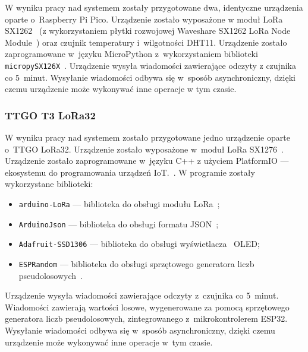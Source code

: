 W wyniku pracy nad systemem zostały przygotowane dwa, identyczne urządzenia oparte o~Raspberry Pi Pico.
Urządzenie zostało wyposażone w moduł LoRa SX1262~\cite{PICO:sx1262-doc} (z wykorzystaniem płytki rozwojowej Waveshare SX1262 LoRa Node Module~\cite{PICO:waveshare-doc}) oraz czujnik temperatury i~wilgotności DHT11.
Urządzenie zostało zaprogramowane w~języku MicroPython z~wykorzystaniem biblioteki \texttt{micropySX126X}~\cite{PICO:lora-lib}.
Urządzenie wysyła wiadomości zawierające odczyty z czujnika co 5~minut.
Wysyłanie wiadomości odbywa się w~sposób asynchroniczny, dzięki czemu urządzenie może wykonywać inne operacje w tym czasie.

\subsubsection{TTGO T3 LoRa32}
W wyniku pracy nad systemem zostało przygotowane jedno urządzenie oparte o~TTGO LoRa32.
Urządzenie zostało wyposażone w~moduł LoRa SX1276~\cite{ESP32:sx1276-doc}.
Urządzenie zostało zaprogramowane w~języku C++ z użyciem PlatformIO — ekosystemu do programowania urządzeń IoT.~\cite{tool:pio}.
W programie zostały wykorzystane biblioteki:
\begin{itemize}
    \item \texttt{arduino-LoRa} — biblioteka do obsługi modułu LoRa~\cite{ESP32:lora-lib};
    \item \texttt{ArduinoJson} — biblioteka do obsługi formatu JSON~\cite{ESP32:ArduinoJson};
    \item \texttt{Adafruit-SSD1306} — biblioteka do obsługi wyświetlacza~\cite{ESP32:Adafruit-SSD1306} OLED;
    \item \texttt{ESPRandom} — biblioteka do obsługi sprzętowego generatora liczb pseudolosowych~\cite{ESP32:ESPRandom}.
\end{itemize}
Urządzenie wysyła wiadomości zawierające odczyty z~czujnika co 5~minut.
Wiadomości zawierają wartości losowe, wygenerowane za pomocą sprzętowego generatora liczb pseudolosowych, zintegrowanego z~mikrokontrolerem ESP32.
Wysyłanie wiadomości odbywa się w~sposób asynchroniczny, dzięki czemu urządzenie może wykonywać inne operacje w~tym czasie.

